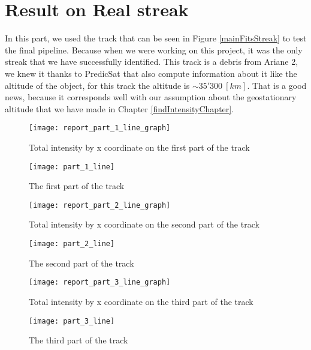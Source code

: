 \documentclass[a4paper,12pt,oneside]{report}
\begin{document}
\section{Result on Real streak}
In this part, we used the track that can be seen in Figure \ref{mainFitsStreak} to test the final pipeline. Because when we were working
on this project, it was the only streak that we have successfully identified. This track is a debris from Ariane 2, we knew it thanks to
PredicSat that also compute information about it like the altitude of the object, for this track the altitude is $\sim 35'300\ [km]$. That
is a good news, because it corresponds well with our assumption about the geostationary altitude that we have made in Chapter \ref{findIntensityChapter}.
\begin{figure}[h]
    \begin{minipage}[c]{.47\linewidth}
        \centering
        \texttt{[image: report\_part\_1\_line\_graph]}
        \caption{Total intensity by x coordinate on the first part of the track}
        \label{graphPart1Track}
    \end{minipage}
    \hfill
    \begin{minipage}[c]{.47\linewidth}
        \centering
        \texttt{[image: part\_1\_line]}
        \caption{The first part of the track}
    \end{minipage}
\end{figure}
\hfill
\begin{figure}[h]
    \begin{minipage}[c]{.47\linewidth}
        \centering
        \texttt{[image: report\_part\_2\_line\_graph]}
        \caption{Total intensity by x coordinate on the second part of the track}
        \label{graphPart2Track}
    \end{minipage}
    \hfill
    \begin{minipage}[c]{.47\linewidth}
        \centering
        \texttt{[image: part\_2\_line]}
        \caption{The second part of the track}
    \end{minipage}
\end{figure}
\begin{figure}[h]
    \begin{minipage}[c]{.47\linewidth}
        \centering
        \texttt{[image: report\_part\_3\_line\_graph]}
        \caption{Total intensity by x coordinate on the third part of the track}
        \label{graphPart3Track}
    \end{minipage}
    \hfill
    \begin{minipage}[c]{.47\linewidth}
        \centering
        \texttt{[image: part\_3\_line]}
        \caption{The third part of the track}
    \end{minipage}
\end{figure}
\end{document}
